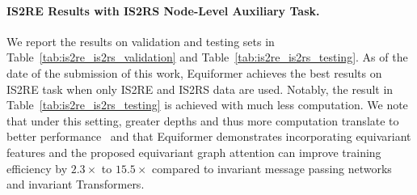 \paragraph{IS2RE Results with IS2RS Node-Level Auxiliary Task.}
We report the results on validation and testing sets in Table~\ref{tab:is2re_is2rs_validation} and Table~\ref{tab:is2re_is2rs_testing}.
As of the date of the submission of this work, Equiformer achieves the best results on IS2RE task when only IS2RE and IS2RS data are used.
Notably, the result in Table~\ref{tab:is2re_is2rs_testing} is achieved with much less computation.
We note that under this setting, greater depths and thus more computation translate to better performance~\citep{noisy_nodes} and that Equiformer demonstrates incorporating equivariant features and the proposed equivariant graph attention can improve training efficiency by $2.3\times$ to $15.5\times$ compared to invariant message passing networks and invariant Transformers.
